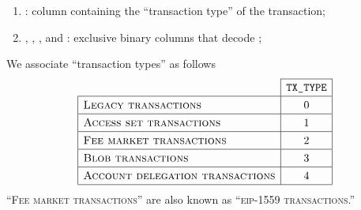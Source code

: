 \begin{enumerate}
	\item
		\txnDataRlpTxType{}:
		column containing the ``transaction type'' of the transaction;
	\item 
		\txnDataRlpIsLegacyTransaction{},
		\txnDataRlpIsAccessSetTransaction{},
		\txnDataRlpIsTypeTwoTransaction{},
		\txnDataRlpIsBlobTransaction{} and
		\txnDataRlpIsAccountDelegationTransaction{}:
		exclusive binary columns that decode
		\txnDataRlpTxType{};
\end{enumerate}
We associate ``transaction types'' as follows
\[
	\renewcommand{\arraystretch}{1.3}
	\begin{array}{|l|c|}
		\cline{2-2}
		\multicolumn{1}{c|}{}                    & \texttt{TX\_TYPE} \\ \hline
		\textsc{Legacy transactions}             & 0                 \\ \hline
		\textsc{Access set transactions}         & 1                 \\ \hline
		\textsc{Fee market transactions}         & 2                 \\ \hline
		\textsc{Blob transactions}               & 3                 \\ \hline
		\textsc{Account delegation transactions} & 4                 \\ \hline
	\end{array}
\]
\saNote{}
``\textsc{Fee market transactions}'' are also known as ``\textsc{eip-1559 transactions}.''
